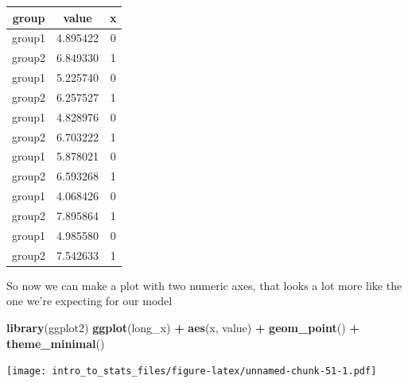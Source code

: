 \documentclass[
]{book}
\newenvironment{Shaded}{\begin{snugshade}}{\end{snugshade}}
\newcommand{\DataTypeTok}[1]{\textcolor[rgb]{0.13,0.29,0.53}{#1}}
\newcommand{\DecValTok}[1]{\textcolor[rgb]{0.00,0.00,0.81}{#1}}
\newcommand{\KeywordTok}[1]{\textcolor[rgb]{0.13,0.29,0.53}{\textbf{#1}}}
\newcommand{\NormalTok}[1]{#1}
\newcommand{\OperatorTok}[1]{\textcolor[rgb]{0.81,0.36,0.00}{\textbf{#1}}}
\newcommand{\StringTok}[1]{\textcolor[rgb]{0.31,0.60,0.02}{#1}}
\begin{document}
\begin{Shaded}
\end{Shaded}

\begin{tabular}{c|c|c}
\hline
group & value & x\\
\hline
group1 & 4.895422 & 0\\
\hline
group2 & 6.849330 & 1\\
\hline
group1 & 5.225740 & 0\\
\hline
group2 & 6.257527 & 1\\
\hline
group1 & 4.828976 & 0\\
\hline
group2 & 6.703222 & 1\\
\hline
group1 & 5.878021 & 0\\
\hline
group2 & 6.593268 & 1\\
\hline
group1 & 4.068426 & 0\\
\hline
group2 & 7.895864 & 1\\
\hline
group1 & 4.985580 & 0\\
\hline
group2 & 7.542633 & 1\\
\hline
\end{tabular}

So now we can make a plot with two numeric axes, that looks a lot more like the one we're expecting for our model

\begin{Shaded}
\begin{Highlighting}[]
\KeywordTok{library}\NormalTok{(ggplot2)}
  \KeywordTok{ggplot}\NormalTok{(long_x) }\OperatorTok{+}\StringTok{ }\KeywordTok{aes}\NormalTok{(x, value) }\OperatorTok{+}\StringTok{ }\KeywordTok{geom_point}\NormalTok{() }\OperatorTok{+}\StringTok{ }\KeywordTok{theme_minimal}\NormalTok{() }
\end{Highlighting}
\end{Shaded}

\texttt{[image: intro\_to\_stats\_files/figure-latex/unnamed-chunk-51-1.pdf]}
\end{document}
